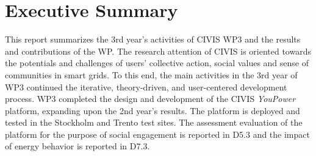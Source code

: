 
\section*{Executive Summary}

This report summarizes the 3rd year's activities of CIVIS WP3 and the results and contributions of the WP. The research attention of CIVIS is oriented towards the potentials and challenges of users' collective action, social values and sense of communities in smart grids. To this end, the main activities in the 3rd year of WP3 continued the iterative, theory-driven, and user-centered development process. WP3 completed the design and development of the CIVIS \textit{YouPower} platform, expanding upon the 2nd year's results. The platform is deployed and tested in the Stockholm and Trento test sites. The assessment evaluation of the platform for the purpose of social engagement is reported in D5.3 and the impact of energy behavior is reported in D7.3.

